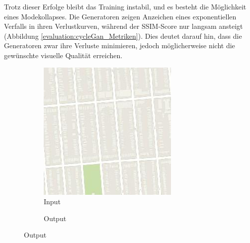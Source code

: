 Trotz dieser Erfolge bleibt das Training instabil, und es besteht die Möglichkeit eines Modekollapses. Die Generatoren zeigen Anzeichen eines exponentiellen Verfalls in ihren Verlustkurven, während der SSIM-Score nur langsam ansteigt (Abbildung \ref{evaluation:cycleGan_Metriken}). Dies deutet darauf hin, dass die Generatoren zwar ihre Verluste minimieren, jedoch möglicherweise nicht die gewünschte visuelle Qualität erreichen.\\

\begin{figure}
  \begin{subfigure}[t]{.14\textwidth}
    \caption*{Input}
    \centering
    \includegraphics[width=\linewidth]{images/cycleGanResults/Maps10_Or_Ld120_E100_Lr0002.jpg}
  \end{subfigure}
  \begin{subfigure}[t]{.14\textwidth}
    \caption*{Output}
    \centering

\end{subfigure}
\end{figure}
